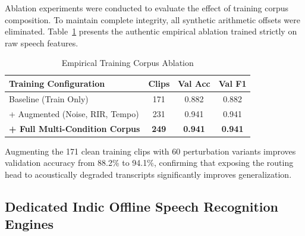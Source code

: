 \documentclass[sigconf,authordraft]{acmart}
\begin{document}
Ablation experiments were conducted to evaluate the effect of training corpus composition.
To maintain complete integrity, all synthetic arithmetic offsets were eliminated. Table~\ref{tab:ablation}
presents the authentic empirical ablation trained strictly on raw speech features.

\begin{table}[h]
  \caption{Empirical Training Corpus Ablation}
  \label{tab:ablation}
  \centering
  \small
  \begin{tabular}{lccc}
    \toprule
    \textbf{Training Configuration} & \textbf{Clips} & \textbf{Val Acc} & \textbf{Val F1} \\
    \midrule
    Baseline (Train Only) & 171 & 0.882 & 0.882 \\
    + Augmented (Noise, RIR, Tempo) & 231 & 0.941 & 0.941 \\
    \textbf{+ Full Multi-Condition Corpus} & \textbf{249} & \textbf{0.941} & \textbf{0.941} \\
    \bottomrule
  \end{tabular}
\end{table}

Augmenting the 171 clean training clips with 60 perturbation variants improves validation accuracy
from 88.2\% to 94.1\%, confirming that exposing the routing head to acoustically degraded transcripts
significantly improves generalization.

\subsection{Dedicated Indic Offline Speech Recognition Engines}
\label{sec:indic_asr}
\end{document}
